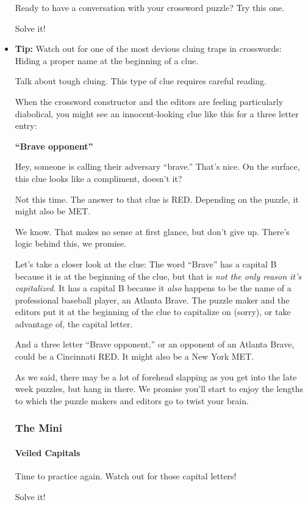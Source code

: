 \begin{itemize}
  Ready to have a conversation with your crossword puzzle? Try this one.

  Solve it!
\item
  \textbf{Tip:} Watch out for one of the most devious cluing traps in
  crosswords: Hiding a proper name at the beginning of a clue.

  Talk about tough cluing. This type of clue requires careful reading.

  When the crossword constructor and the editors are feeling
  particularly diabolical, you might see an innocent-looking clue like
  this for a three letter entry:

  \textbf{``Brave opponent''}

  Hey, someone is calling their adversary ``brave.'' That's nice. On the
  surface, this clue looks like a compliment, doesn't it?~

  Not this time. The answer to that clue is RED. Depending on the
  puzzle, it might also be MET.

  We know. That makes no sense at first glance, but don't give up.
  There's logic behind this, we promise.

  Let's take a closer look at the clue: The word ``Brave'' has a capital
  B because it is at the beginning of the clue, but that is \emph{not
  the only reason it's capitalized}. It has a capital B because it
  \emph{also} happens to be the name of a professional baseball player,
  an Atlanta Brave. The puzzle maker and the editors put it at the
  beginning of the clue to capitalize on (sorry), or take advantage of,
  the capital letter.

  And a three letter ``Brave opponent,'' or an opponent of an Atlanta
  Brave, could be a Cincinnati RED. It might also be a New York MET.

  As we said, there may be a lot of forehead slapping as you get into
  the late week puzzles, but hang in there. We promise you'll start to
  enjoy the lengths to which the puzzle makers and editors go to twist
  your brain.

  \hypertarget{the-mini-12}{%
  \subsubsection{The Mini}\label{the-mini-12}}

  \href{https://www.nytimes.com/crosswords/game/special/veiled-capitals}{}

  \hypertarget{veiled-capitals}{%
  \paragraph{Veiled Capitals}\label{veiled-capitals}}

  Time to practice again. Watch out for those capital letters!

  Solve it!
\end{itemize}

